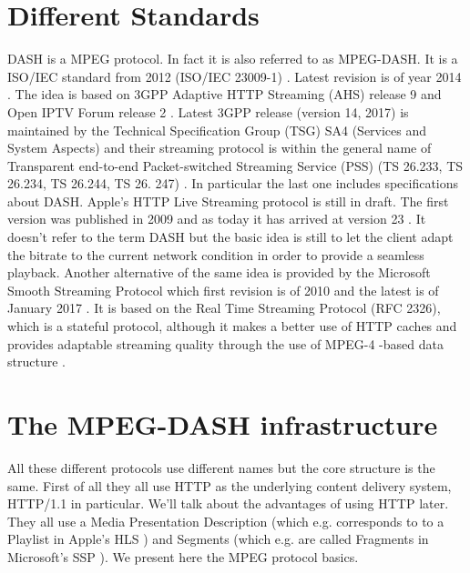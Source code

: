 \documentclass[openany]{book}
\begin{document}
\section{Different Standards}
DASH is a MPEG protocol. In fact it is also referred to as MPEG-DASH. It is a ISO/IEC standard from 2012 (ISO/IEC 23009-1) \cite{wiki}. Latest revision is of year 2014 \cite{MPEG}. The idea is based on 3GPP Adaptive HTTP Streaming (AHS) release 9 and Open IPTV Forum release 2 \cite{wiki}. Latest 3GPP release (version 14, 2017) is maintained by the Technical Specification Group (TSG) SA4 (Services and System Aspects) and their streaming protocol is within the general name of Transparent end-to-end Packet-switched Streaming Service (PSS) (TS 26.233, TS 26.234, TS 26.244, TS 26. 247) \cite{TS26.233, TS26.234, TS26.244, TS26.247}. In particular the last one includes specifications about DASH. Apple’s HTTP Live Streaming protocol is still in draft. The first version was published in 2009 \cite{HLS} and as today it has arrived at version 23 \cite{HLS}. It doesn’t refer to the term DASH but the basic idea is still to let the client adapt the bitrate to the current network condition in order to provide a seamless playback. Another alternative of the same idea is provided by the Microsoft Smooth Streaming Protocol which first revision is of 2010 \cite{MS} and the latest is of January 2017 \cite{MS}. It is based on the Real Time Streaming Protocol (RFC 2326), which is a stateful protocol, although it makes a better use of HTTP caches and provides adaptable streaming quality through the use of MPEG-4 -based data structure \cite{MS}.
\section{The MPEG-DASH infrastructure}\label{sec:mpegdash}
All these different protocols use different names but the core structure is the same. First of all they all use HTTP as the underlying content delivery system, HTTP/1.1 in particular. We’ll talk about the advantages of using HTTP later. They all use a Media Presentation Description (which e.g. corresponds to to a Playlist in Apple's HLS \cite{HLS}) and Segments (which e.g. are called Fragments in Microsoft's SSP \cite{MS}). We present here the MPEG protocol basics.
\end{document}
